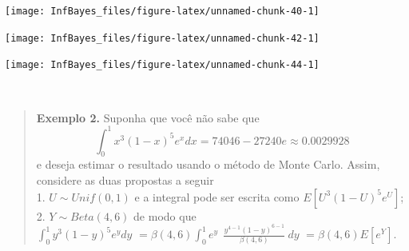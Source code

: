 \documentclass[
]{book}
\newenvironment{Shaded}{\begin{snugshade}}{\end{snugshade}}
\newcommand{\AttributeTok}[1]{\textcolor[rgb]{0.77,0.63,0.00}{#1}}
\newcommand{\ConstantTok}[1]{\textcolor[rgb]{0.00,0.00,0.00}{#1}}
\newcommand{\DecValTok}[1]{\textcolor[rgb]{0.00,0.00,0.81}{#1}}
\newcommand{\FunctionTok}[1]{\textcolor[rgb]{0.00,0.00,0.00}{#1}}
\newcommand{\NormalTok}[1]{#1}
\newcommand{\SpecialCharTok}[1]{\textcolor[rgb]{0.00,0.00,0.00}{#1}}
\newcommand{\StringTok}[1]{\textcolor[rgb]{0.31,0.60,0.02}{#1}}
\begin{document}
\begin{Shaded}
\end{Shaded}

\begin{center}\texttt{[image: InfBayes\_files/figure-latex/unnamed-chunk-40-1]} \end{center}

\begin{center}\texttt{[image: InfBayes\_files/figure-latex/unnamed-chunk-42-1]} \end{center}

\begin{center}\texttt{[image: InfBayes\_files/figure-latex/unnamed-chunk-44-1]} \end{center}

\(~\)

\begin{quote}
\textbf{Exemplo 2.} Suponha que você não sabe que
\[\displaystyle \int_0^1 x^3(1-x)^5e^xdx = 74046 - 27240e\approx0.0029928\]
e deseja estimar o resultado usando o método de Monte Carlo. Assim, considere as duas propostas a seguir\\
1. \(U \sim Unif (0,1)\) e a integral pode ser escrita como \(E\left[U^3(1-U)^5e^U\right]\);\\
2. \(Y \sim Beta(4,6)\) de modo que\\
\(\displaystyle \int_0^1 y^3(1-y)^5e^y dy\) \(=\beta(4,6)\displaystyle \int_0^1 e^y~~\frac{y^{4-1}(1-y)^{6-1}}{\beta(4,6)}~dy\) \(=\beta(4,6)E\left[e^Y\right]\).
\end{quote}
\end{document}
